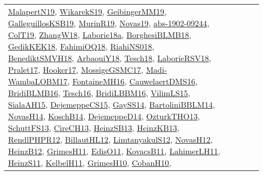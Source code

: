{\begin{longtable}{lp{3cm}>{\raggedright}p{6cm}>{\raggedright}p{6cm}p{8cm}}
\href{papers/MalapertN19.pdf}{MalapertN19}\cite{MalapertN19}, \href{articles/WikarekS19.pdf}{WikarekS19}\cite{WikarekS19}, \href{papers/GeibingerMM19.pdf}{GeibingerMM19}\cite{GeibingerMM19}, \href{papers/GalleguillosKSB19.pdf}{GalleguillosKSB19}\cite{GalleguillosKSB19}, \href{papers/MurinR19.pdf}{MurinR19}\cite{MurinR19}, \href{articles/Novas19.pdf}{Novas19}\cite{Novas19}, \href{articles/abs-1902-09244.pdf}{abs-1902-09244}\cite{abs-1902-09244}, \href{papers/ColT19.pdf}{ColT19}\cite{ColT19}, \href{articles/ZhangW18.pdf}{ZhangW18}\cite{ZhangW18}, \href{papers/Laborie18a.pdf}{Laborie18a}\cite{Laborie18a}, \href{articles/BorghesiBLMB18.pdf}{BorghesiBLMB18}\cite{BorghesiBLMB18}, \href{articles/GedikKEK18.pdf}{GedikKEK18}\cite{GedikKEK18}, \href{articles/FahimiOQ18.pdf}{FahimiOQ18}\cite{FahimiOQ18}, \href{papers/RiahiNS018.pdf}{RiahiNS018}\cite{RiahiNS018}, \href{papers/BenediktSMVH18.pdf}{BenediktSMVH18}\cite{BenediktSMVH18}, \href{papers/ArbaouiY18.pdf}{ArbaouiY18}\cite{ArbaouiY18}, \href{papers/Tesch18.pdf}{Tesch18}\cite{Tesch18}, \href{articles/LaborieRSV18.pdf}{LaborieRSV18}\cite{LaborieRSV18}, \href{papers/Pralet17.pdf}{Pralet17}\cite{Pralet17}, \href{papers/Hooker17.pdf}{Hooker17}\cite{Hooker17}, \href{papers/MossigeGSMC17.pdf}{MossigeGSMC17}\cite{MossigeGSMC17}, \href{papers/Madi-WambaLOBM17.pdf}{Madi-WambaLOBM17}\cite{Madi-WambaLOBM17}, \href{papers/FontaineMH16.pdf}{FontaineMH16}\cite{FontaineMH16}, \href{papers/CauwelaertDMS16.pdf}{CauwelaertDMS16}\cite{CauwelaertDMS16}, \href{articles/BridiBLMB16.pdf}{BridiBLMB16}\cite{BridiBLMB16}, \href{papers/Tesch16.pdf}{Tesch16}\cite{Tesch16}, \href{papers/BridiLBBM16.pdf}{BridiLBBM16}\cite{BridiLBBM16}, \href{papers/VilimLS15.pdf}{VilimLS15}\cite{VilimLS15}, \href{papers/SialaAH15.pdf}{SialaAH15}\cite{SialaAH15}, \href{papers/DejemeppeCS15.pdf}{DejemeppeCS15}\cite{DejemeppeCS15}, \href{papers/GaySS14.pdf}{GaySS14}\cite{GaySS14}, \href{papers/BartoliniBBLM14.pdf}{BartoliniBBLM14}\cite{BartoliniBBLM14}, \href{articles/NovasH14.pdf}{NovasH14}\cite{NovasH14}, \href{papers/KoschB14.pdf}{KoschB14}\cite{KoschB14}, \href{papers/DejemeppeD14.pdf}{DejemeppeD14}\cite{DejemeppeD14}, \href{articles/OzturkTHO13.pdf}{OzturkTHO13}\cite{OzturkTHO13}, \href{papers/SchuttFS13.pdf}{SchuttFS13}\cite{SchuttFS13}, \href{papers/CireCH13.pdf}{CireCH13}\cite{CireCH13}, \href{articles/HeinzSB13.pdf}{HeinzSB13}\cite{HeinzSB13}, \href{papers/HeinzKB13.pdf}{HeinzKB13}\cite{HeinzKB13}, \href{papers/RendlPHPR12.pdf}{RendlPHPR12}\cite{RendlPHPR12}, \href{papers/BillautHL12.pdf}{BillautHL12}\cite{BillautHL12}, \href{articles/LimtanyakulS12.pdf}{LimtanyakulS12}\cite{LimtanyakulS12}, \href{articles/NovasH12.pdf}{NovasH12}\cite{NovasH12}, \href{papers/HeinzB12.pdf}{HeinzB12}\cite{HeinzB12}, \href{papers/GrimesH11.pdf}{GrimesH11}\cite{GrimesH11}, \href{papers/EdisO11.pdf}{EdisO11}\cite{EdisO11}, \href{articles/KovacsB11.pdf}{KovacsB11}\cite{KovacsB11}, \href{papers/LahimerLH11.pdf}{LahimerLH11}\cite{LahimerLH11}, \href{papers/HeinzS11.pdf}{HeinzS11}\cite{HeinzS11}, \href{articles/KelbelH11.pdf}{KelbelH11}\cite{KelbelH11}, \href{papers/GrimesH10.pdf}{GrimesH10}\cite{GrimesH10}, \href{papers/CobanH10.pdf}{CobanH10}\cite{CobanH10}, 
\end{longtable}}
